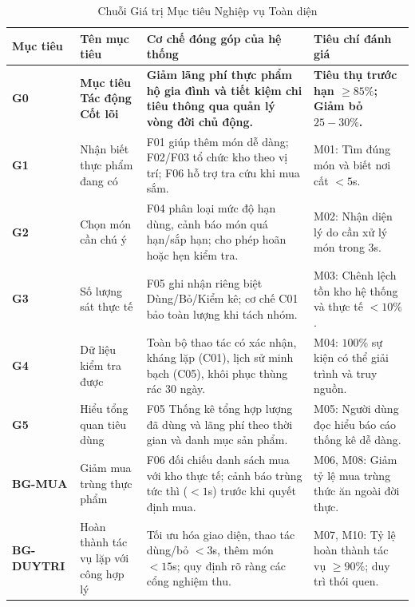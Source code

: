 \documentclass[10pt,a4paper]{article}
\begin{document}
\begin{table}[h]
\centering
\begin{tabularx}{\textwidth}{|l|p{3.0cm}|X|p{2.8cm}|}
\hline
\textbf{Mục tiêu} & \textbf{Tên mục tiêu} & \textbf{Cơ chế đóng góp của hệ thống} & \textbf{Tiêu chí đánh giá} \\
\hline
\textbf{G0} & \textbf{Mục tiêu Tác động Cốt lõi} & \textbf{Giảm lãng phí thực phẩm hộ gia đình và tiết kiệm chi tiêu thông qua quản lý vòng đời chủ động.} & \textbf{Tiêu thụ trước hạn $\ge 85\%$; Giảm bỏ $25-30\%$.} \\
\hline
\textbf{G1} & Nhận biết thực phẩm đang có & F01 giúp thêm món dễ dàng; F02/F03 tổ chức kho theo vị trí; F06 hỗ trợ tra cứu khi mua sắm. & M01: Tìm đúng món và biết nơi cất $<5$s. \\
\hline
\textbf{G2} & Chọn món cần chú ý & F04 phân loại mức độ hạn dùng, cảnh báo món quá hạn/sắp hạn; cho phép hoãn hoặc hẹn kiểm tra. & M02: Nhận diện lý do cần xử lý món trong 3s. \\
\hline
\textbf{G3} & Số lượng sát thực tế & F05 ghi nhận riêng biệt Dùng/Bỏ/Kiểm kê; cơ chế C01 bảo toàn lượng khi tách nhóm. & M03: Chênh lệch tồn kho hệ thống và thực tế $<10\%$. \\
\hline
\textbf{G4} & Dữ liệu kiểm tra được & Toàn bộ thao tác có xác nhận, kháng lặp (C01), lịch sử minh bạch (C05), khôi phục thùng rác 30 ngày. & M04: $100\%$ sự kiện có thể giải trình và truy nguồn. \\
\hline
\textbf{G5} & Hiểu tổng quan tiêu dùng & F05 Thống kê tổng hợp lượng đã dùng và lãng phí theo thời gian và danh mục sản phẩm. & M05: Người dùng đọc hiểu báo cáo thống kê dễ dàng. \\
\hline
\textbf{BG-MUA} & Giảm mua trùng thực phẩm & F06 đối chiếu danh sách mua với kho thực tế; cảnh báo trùng tức thì ($<1$s) trước khi quyết định mua. & M06, M08: Giảm tỷ lệ mua trùng thức ăn ngoài đời thực. \\
\hline
\textbf{BG-DUYTRI} & Hoàn thành tác vụ lặp với công hợp lý & Tối ưu hóa giao diện, thao tác dùng/bỏ $<3$s, thêm món $<15$s; quy định rõ ràng các cổng nghiệm thu. & M07, M10: Tỷ lệ hoàn thành tác vụ $\ge 90\%$; duy trì thói quen. \\
\hline
\end{tabularx}
\caption{Chuỗi Giá trị Mục tiêu Nghiệp vụ Toàn diện}
\end{table}
\end{document}
